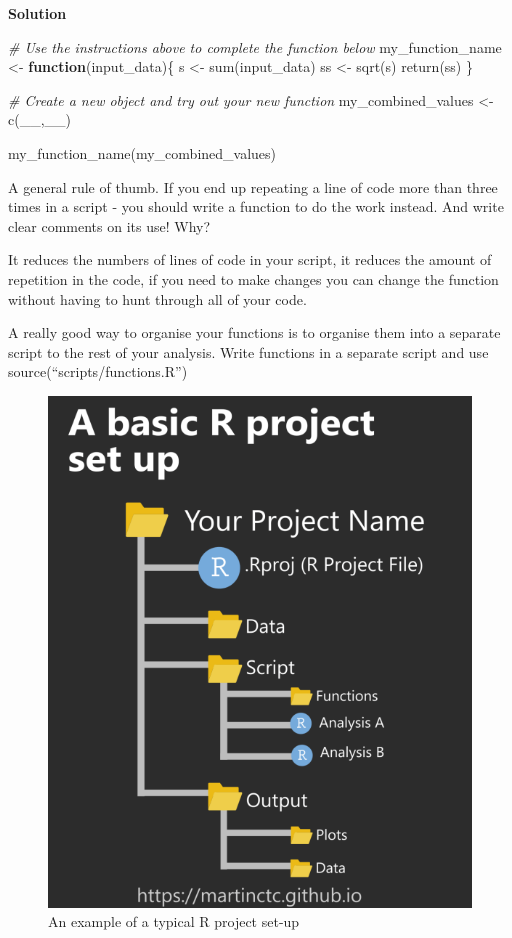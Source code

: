 \documentclass[
]{book}
\newenvironment{Shaded}{\begin{snugshade}}{\end{snugshade}}
\newcommand{\CommentTok}[1]{\textcolor[rgb]{0.56,0.35,0.01}{\textit{#1}}}
\newcommand{\ControlFlowTok}[1]{\textcolor[rgb]{0.13,0.29,0.53}{\textbf{#1}}}
\newcommand{\FunctionTok}[1]{\textcolor[rgb]{0.00,0.00,0.00}{#1}}
\newcommand{\NormalTok}[1]{#1}
\newcommand{\OtherTok}[1]{\textcolor[rgb]{0.56,0.35,0.01}{#1}}
\begin{document}
\textbf{Solution}

\begin{Shaded}
\begin{Highlighting}[]
\CommentTok{\# Use the instructions above to complete the function below}
\NormalTok{my\_function\_name }\OtherTok{\textless{}{-}} \ControlFlowTok{function}\NormalTok{(input\_data)\{}
\NormalTok{  s }\OtherTok{\textless{}{-}} \FunctionTok{sum}\NormalTok{(input\_data)}
\NormalTok{  ss }\OtherTok{\textless{}{-}} \FunctionTok{sqrt}\NormalTok{(s)}
  \FunctionTok{return}\NormalTok{(ss)}
\NormalTok{\}}

\CommentTok{\# Create a new object and try out your new function}
\NormalTok{my\_combined\_values }\OtherTok{\textless{}{-}} \FunctionTok{c}\NormalTok{(\_\_,\_\_) }

\FunctionTok{my\_function\_name}\NormalTok{(my\_combined\_values)}
\end{Highlighting}
\end{Shaded}

A general rule of thumb. If you end up repeating a line of code more than three times in a script - you should write a function to do the work instead. And write clear comments on its use!
Why?

It reduces the numbers of lines of code in your script, it reduces the amount of repetition in the code, if you need to make changes you can change the function without having to hunt through all of your code.

A really good way to organise your functions is to organise them into a separate script to the rest of your analysis. Write functions in a separate script and use source(``scripts/functions.R'')

\begin{figure}
\includegraphics[width=0.8\linewidth]{images/project} \caption{An example of a typical R project set-up}\label{fig:unnamed-chunk-349}
\end{figure}
\end{document}
